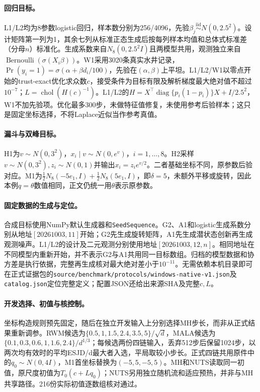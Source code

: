 \paragraph{回归目标。}
L1/L2均为8参数logistic回归，样本数分别为256/4096，先验$\beta_j\overset{\mathrm{iid}}\sim N(0,2.5^2)$。设计矩阵第一列为1，其余七列从标准正态生成后按每列样本均值和总体式标准差（分母$n$）标准化。生成系数来自$N_8(0,2.5^2I)$且两模型共用，观测独立来自$\operatorname{Bernoulli}(\sigma(X_i\beta))$。W1采用3020条真实水井记录，$\Pr(y_i=1)=\sigma(\alpha+\beta d_i/100)$，先验在$(\alpha,\beta)$上平坦。L1/L2/W1以零点开始的trust-exact优化求众数$c$，接受条件为目标有限及解析梯度最大绝对值不超过$10^{-7}$；$L=\operatorname{chol}(H(c)^{-1})$。L1/L2的$H=X^\top\operatorname{diag}\{p_i(1-p_i)\}X+I/2.5^2$，W1不加先验项。优化最多300步，未做特征值修复，未使用参考后验样本；这只是固定坐标选择，不将Laplace近似当作参考真值。

\paragraph{漏斗与双峰目标。}
H1为$v\sim N(0,3^2)$，$x_i\mid v\sim N(0,e^v)$，$i=1,\ldots,8$。H2采样$v\sim N(0,3^2),z_i\sim N(0,1)$并输出$x_i=z_i e^{v/2}$。二者基础坐标不同，原参数后验对应。M1为$\tfrac12N_8(-5e_1,I)+\tfrac12N_8(5e_1,I)$，即$\delta=5$，未额外平移或旋转，因此本例$q=\theta$数值相同，正文仍统一用$\theta$表示原参数。

\paragraph{固定数据的生成与定位。}
合成目标使用NumPy默认生成器和\texttt{SeedSequence}。G2、A1和logistic生成系数分别从地址$[20261003,11]$开始；G2先生成旋转矩阵，A1先生成潜状态创新再生成观测噪声。L1/L2的设计及二元观测分别使用地址$[20261003,12,n]$。相同地址在不同模型内重新开始，并不表示G2与A1共用同一目标数组。归档的模型数据和协方差是执行依据，完整再生成核对最大绝对差小于$10^{-11}$。无需依赖本机目录即可在正式证据包的\texttt{source/benchmark/protocols/windows-native-v1.json}及\texttt{catalog.json}定位完整定义；配置JSON还给出来源SHA及完整$c,L$。

\paragraph{开发选择、初值与核控制。}
坐标构造规则预先固定，随后在独立开发输入上分别选择MH步长，而非从正式结果重新调参。RWM候选为$\{0.5,1,1.5,2.4,3.5,5\}/\sqrt d$，MALA候选为$\{0.1,0.3,0.6,1,1.6,2.4\}/d^{1/3}$；每候选两份四链输入，丢弃512步后保留1024步，以两次均有效时的平均ESJD/d最大者入选，平局取较小步长。正式四链共用原件中的$q_0\sim N(0,4I)$，M1首坐标替换为$(-5,5,-5,5)$。MH和NUTS读取同一初值，原尺度初值为$T_0(c+Lq_0)$；NUTS另用独立随机流和适应预热，并非与MH共享路径。216份实际初值逐数组核对通过。

